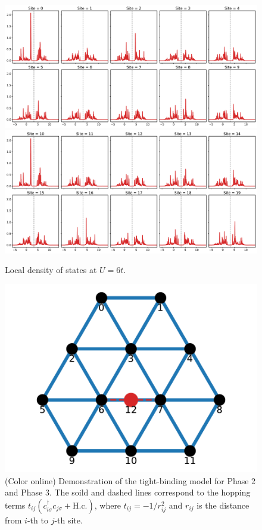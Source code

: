\documentclass[aps,prb,reprint,amsfonts,amsmath,amssymb,showpacs,groupedaddress,superscriptaddress]{revtex4-1}
\begin{document}
\begin{figure}[p]
    \centering
    \includegraphics[width=\columnwidth]{fig/CPTForPhase1LDOS0.pdf}
    \includegraphics[width=\columnwidth]{fig/CPTForPhase1LDOS1.pdf}
    \caption{\label{fig:CPTForPhase1LDOS} Local density of states at $U = 6t$.}
\end{figure}

\begin{figure}[p]
    \includegraphics[width=\columnwidth]{fig/ModelForPhase2andPhase3.pdf}
    \caption{\label{fig:ModelForPhase2andPhase3} (Color online) Demonstration of the tight-binding model for Phase 2 and Phase 3. The soild and dashed lines correspond to the hopping terms $t_{ij} (c_{i\sigma}^{\dagger} c_{j\sigma} + \text{H.c.})$, where $t_{ij} = -1/r_{ij}^{2}$ and $r_{ij}$ is the distance from $i$-th to $j$-th site.}
\end{figure}
\end{document}
